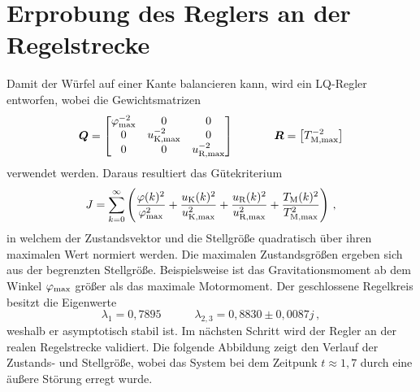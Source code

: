 \section{Erprobung des Reglers an der Regelstrecke}
Damit der Würfel auf einer Kante balancieren kann, wird ein LQ-Regler entworfen, wobei die Gewichtsmatrizen
\begin{equation}
\boldsymbol{Q} = \begin{bmatrix}
\varphi^{-2}_{\text{max}} & 0 & 0 \\
0 & u^{-2}_{\text{K,max}} & 0 \\
0 & 0 & u^{-2}_{\text{R,max}}
\end{bmatrix}
\hspace{35pt}
\boldsymbol{R} = \begin{bmatrix} T^{-2}_{\text{M,max}} \end{bmatrix}
\end{equation}
verwendet werden. Daraus resultiert das Gütekriterium
\begin{equation}
J = \sum^{\infty}_{k=0}\left( \frac{\varphi(k)^2}{\varphi^2_{\text{max}}} + \frac{u_{\text{K}}(k)^2}{u^2_{\text{K,max}}} + \frac{u_{\text{R}}(k)^2}{u^2_{\text{R,max}}} + \frac{T_{\text{M}}(k)^2}{T^2_{\text{M,max}}}\right)\,,
\end{equation}
in welchem der Zustandsvektor und die Stellgröße quadratisch über ihren maximalen Wert normiert werden. Die maximalen Zustandsgrößen ergeben sich aus der begrenzten Stellgröße. Beispielsweise ist das Gravitationsmoment ab dem Winkel $\varphi_{\text{max}}$ größer als das maximale Motormoment. 
Der geschlossene Regelkreis besitzt die Eigenwerte
\begin{equation}
\lambda_1 = 0{,}7895 \hspace{35pt} \lambda_{2,3} = 0{,}8830 \pm 0{,}0087j\,,
\end{equation}
weshalb er asymptotisch stabil ist. Im nächsten Schritt wird der Regler an der realen Regelstrecke validiert. Die folgende Abbildung zeigt den Verlauf der Zustands- und Stellgröße, wobei das System bei dem Zeitpunk $t\approx 1{,}7$ durch eine äußere Störung erregt wurde.
